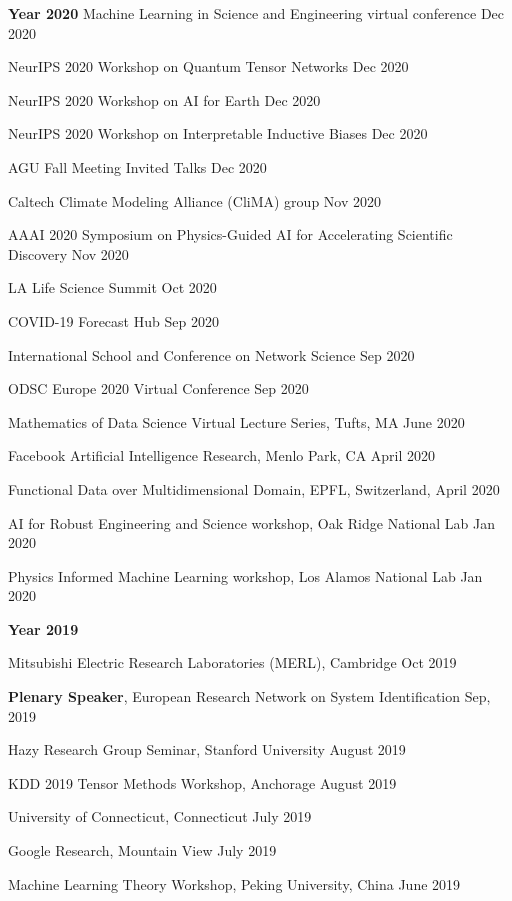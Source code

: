 \documentclass[margin,line]{res}
\begin{document}
\begin{resume}
 {\bf Year  2020}
Machine Learning in Science and Engineering virtual conference \hfill{Dec 2020}


NeurIPS 2020 Workshop on Quantum Tensor Networks \hfill{Dec 2020}

NeurIPS 2020 Workshop on AI for Earth \hfill{Dec 2020}

NeurIPS 2020 Workshop on Interpretable Inductive Biases \hfill{Dec 2020}

AGU Fall Meeting Invited Talks \hfill{Dec 2020}

Caltech Climate Modeling Alliance (CliMA) group  \hfill{Nov 2020}

AAAI 2020 Symposium on Physics-Guided AI for Accelerating Scientific Discovery \hfill{Nov 2020}

LA Life Science Summit \hfill{Oct 2020}

COVID-19 Forecast Hub  \hfill{Sep 2020}
 
International School and Conference on Network Science  \hfill{Sep 2020}
 
 
 ODSC Europe 2020 Virtual Conference \hfill{Sep 2020}

 
 Mathematics of Data Science Virtual Lecture Series, Tufts, MA \hfill{June 2020}
 
 
Facebook Artificial Intelligence Research,  Menlo Park, CA \hfill{April 2020}


 Functional Data over Multidimensional Domain, EPFL, Switzerland,   \hfill{April 2020}
 
 
AI for Robust Engineering and Science workshop,  Oak Ridge National Lab \hfill{Jan 2020}
 
 
Physics Informed Machine Learning workshop,  Los Alamos National Lab \hfill {Jan 2020}


 {\bf Year  2019}
 

Mitsubishi Electric Research Laboratories (MERL), Cambridge  \hfill {Oct  2019}


\textbf{Plenary Speaker},  European Research Network on System Identification   \hfill {Sep, 2019}


Hazy Research Group Seminar,  Stanford University  \hfill {August 2019}

KDD 2019 Tensor Methods Workshop, Anchorage \hfill{August 2019}

University  of Connecticut,   Connecticut \hfill{July 2019}

Google  Research, Mountain View \hfill{July 2019}

Machine Learning Theory Workshop,  Peking University, China  \hfill{June 2019}


\end{resume}
\end{document}
